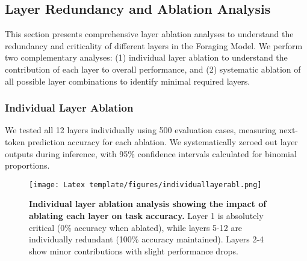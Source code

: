 
\subsection{Layer Redundancy and Ablation Analysis}

This section presents comprehensive layer ablation analyses to understand the redundancy and criticality of different layers in the Foraging Model. We perform two complementary analyses: (1) individual layer ablation to understand the contribution of each layer to overall performance, and (2) systematic ablation of all possible layer combinations to identify minimal required layers.

\subsubsection{Individual Layer Ablation}

We tested all 12 layers individually using 500 evaluation cases, measuring next-token prediction accuracy for each ablation. We systematically zeroed out layer outputs during inference, with 95\% confidence intervals calculated for binomial proportions.

\begin{figure}[H]
\centering
\texttt{[image: Latex template/figures/individuallayerabl.png]}
\caption[Individual layer ablation results]{\textbf{Individual layer ablation analysis showing the impact of ablating each layer on task accuracy.} Layer 1 is absolutely critical (0\% accuracy when ablated), while layers 5-12 are individually redundant (100\% accuracy maintained). Layers 2-4 show minor contributions with slight performance drops.}
\label{fig:individual_layer_ablation}
\end{figure}

